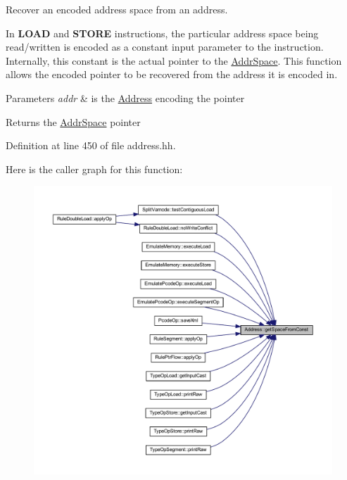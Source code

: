 Recover an encoded address space from an address. 

In {\bfseries{L\+O\+AD}} and {\bfseries{S\+T\+O\+RE}} instructions, the particular address space being read/written is encoded as a constant input parameter to the instruction. Internally, this constant is the actual pointer to the \mbox{\hyperlink{class_addr_space}{Addr\+Space}}. This function allows the encoded pointer to be recovered from the address it is encoded in. 
\begin{DoxyParams}{Parameters}
{\em addr} & is the \mbox{\hyperlink{class_address}{Address}} encoding the pointer \\
\hline
\end{DoxyParams}
\begin{DoxyReturn}{Returns}
the \mbox{\hyperlink{class_addr_space}{Addr\+Space}} pointer 
\end{DoxyReturn}


Definition at line 450 of file address.\+hh.

Here is the caller graph for this function\+:
\nopagebreak
\begin{figure}[H]
\begin{center}
\leavevmode
\includegraphics[width=350pt]{class_address_acd17db20230415cb1fe1ad33c34c11ff_icgraph}
\end{center}
\end{figure}
\mbox{\label{class_address_aec0c5e9a64d45b7e913e61eb064bcc2d}} 

